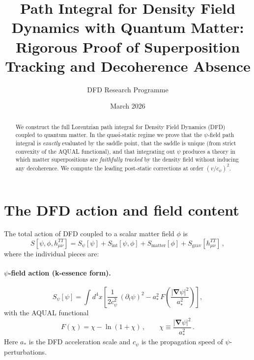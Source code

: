 \documentclass[12pt,a4paper]{article}
\title{Path Integral for Density Field Dynamics with Quantum Matter:\\
Rigorous Proof of Superposition Tracking and Decoherence Absence}
\author{DFD Research Programme}
\date{March 2026}
\theoremstyle{definition}
\theoremstyle{remark}
\newcommand{\grad}{\boldsymbol{\nabla}}
\begin{document}
\maketitle

\begin{abstract}
We construct the full Lorentzian path integral for Density Field Dynamics (DFD)
coupled to quantum matter.  In the quasi-static regime we prove that the
$\psi$-field path integral is \emph{exactly} evaluated by the saddle point,
that the saddle is unique (from strict convexity of the AQUAL functional),
and that integrating out $\psi$ produces a theory in which matter
superpositions are \emph{faithfully tracked} by the density field without
inducing any decoherence.  We compute the leading post-static corrections
at order $(v/c_\psi)^2$.
\end{abstract}

\tableofcontents

\section{The DFD action and field content}
\label{sec:action}

The total action of DFD coupled to a scalar matter field $\phi$ is
\begin{equation}
\label{eq:total_action}
S[\psi, \phi, h^{TT}_{\mu\nu}]
= S_\psi[\psi] + S_{\mathrm{int}}[\psi, \phi] + S_{\mathrm{matter}}[\phi]
  + S_{\mathrm{grav}}[h^{TT}_{\mu\nu}]\,,
\end{equation}
where the individual pieces are:

\paragraph{$\psi$-field action (k-essence form).}
\begin{equation}
\label{eq:S_psi}
S_\psi[\psi] = \int d^4x \left[
  \frac{1}{2c_\psi^2}\,(\partial_t \psi)^2
  - a_*^2\, F\!\left(\frac{|\grad\psi|^2}{a_*^2}\right)
\right],
\end{equation}
with the AQUAL functional
\begin{equation}
\label{eq:F_AQUAL}
F(\chi) = \chi - \ln(1 + \chi)\,,\qquad \chi \equiv \frac{|\grad\psi|^2}{a_*^2}\,.
\end{equation}
Here $a_*$ is the DFD acceleration scale and $c_\psi$ is the propagation speed
of $\psi$-perturbations.
\end{document}
